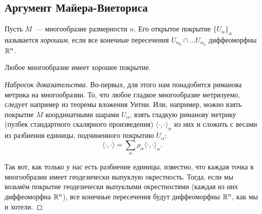 
	\subsection{Аргумент Майера-Виеториса}

	\begin{definition} 
		Пусть $M$~--- многообразие размерности $n$. Его открытое покрытие $\{ U_{\alpha} \}_{\alpha}$ называется \emph{хорошим}, если все конечные пересечения $U_{\alpha_0} \cap \ldots U_{\alpha_n}$ диффеоморфны $\mathbb{R}^n$. 
	\end{definition}

	\begin{theorem} 
		Любое многообразие имеет хорошее покрытие. 
	\end{theorem}
	\begin{proof}[Набросок доказательства]
		Во-первых, для этого нам понадобится риманова метрика на многообразии. То, что любое гладкое многообразие метризуемо, следует например из теоремы вложения Уитни. Или, например, можно взять покрытие $M$ координатными шарами $U_{\alpha}$, взять гладкую риманову метрику (пулбек стандартного скалярного произведения) $\langle  \cdot, \cdot \rangle_{\alpha}$ из них и сложить с весами из разбиения единицы, подчиненного покрытию $U_{\alpha}$: 
		\[
			\langle \cdot, \cdot \rangle = \sum_{\alpha} \rho_{\alpha} \langle \cdot, \cdot \rangle_{\alpha}. 
		\]

		Так вот, как только у нас есть разбиение единицы, известно, что каждая точка в многообразии имеет геодезически выпуклую окрестность. Тогда, если мы возьмём покрытие геодезически выпуклыми окрестностями (каждая из них диффеоморфна $\mathbb{R}^n$), все конечные пересечения будут диффеоморфны $\mathbb{R}^n$, как мы и хотели. 
	\end{proof}

